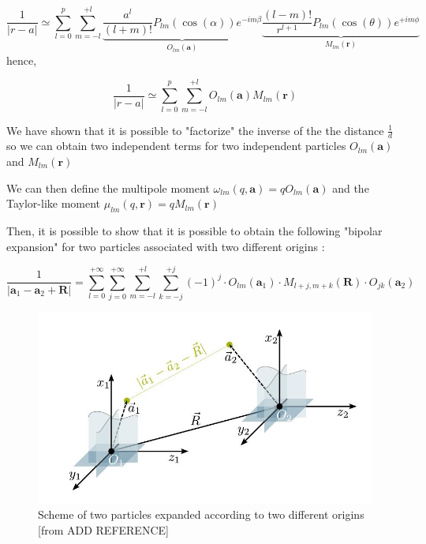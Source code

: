 \documentclass[11pt,twoside,a4paper]{report}
\begin{document}
		\begin{equation}
	\frac{1}{|r - a|} \simeq \sum\limits_{l=0}^{p} \sum\limits_{m = -l}^{+l}
	\underbrace{\frac{a^l}{(l+m)!} P_{lm}(\cos(\alpha))e^{-im\beta}} _{O_{lm}(\textbf{a})}
    \underbrace{\frac{(l-m)!}{r^{l+1}} P_{lm}(\cos(\theta))e^{+im\phi}} _{M_{lm}(\textbf{r})}
	\end{equation}
	hence,
	
		\begin{equation}
	\frac{1}{|r - a|} \simeq \sum\limits_{l=0}^{p} \sum\limits_{m = -l}^{+l}
	{O_{lm}(\textbf{a})}
    {M_{lm}(\textbf{r})}
	\end{equation}
	
	
	We have shown that it is possible to "factorize" the inverse of the the distance $\frac{1}{d}$ so we can obtain two independent terms for two independent particles ${O_{lm}(\textbf{a})}$ and ${M_{lm}(\textbf{r})}$ 


	We can then define the multipole moment $\omega_{lm}(q,\textbf{a}) = q O_{lm}(\textbf{a})$ and the Taylor-like moment $\mu_{lm}(q,\textbf{r}) = q M_{lm}(\textbf{r})$
	
	Then, it is possible to show that it is possible to obtain the following "bipolar expansion" for two particles associated with two different origins :
	
    \begin{equation}
    \frac{1}{|\textbf{a}_1 - \textbf{a}_2 + \textbf{R}|} = 
    \sum\limits_{l=0}^{+\infty}
    \sum\limits_{j=0}^{+\infty}
    \sum\limits_{m=-l}^{+l}
    \sum\limits_{k=-j}^{+j}
    (-1)^j \cdot O_{lm}(\textbf{a}_1) \cdot M_{l+j,m+k}(\textbf{R}) \cdot O_{jk}(\textbf{a}_2)
    \end{equation}



	\begin{figure}[H]

    \includegraphics[scale=0.7]{bipolar}
    \centering 
    \caption{Scheme of two particles expanded according to two different origins [from ADD REFERENCE]}
    \label{fig:bipolar}
    \end{figure}
\end{document}
